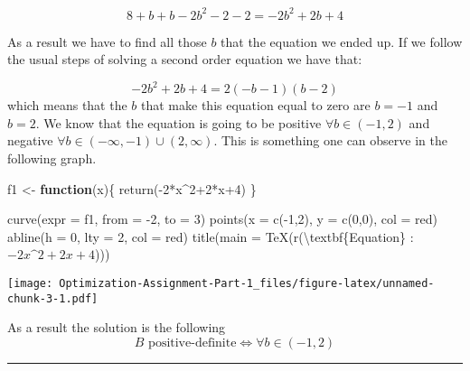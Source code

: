 \documentclass[
]{article}
\newenvironment{Shaded}{\begin{snugshade}}{\end{snugshade}}
\newcommand{\AttributeTok}[1]{\textcolor[rgb]{0.77,0.63,0.00}{#1}}
\newcommand{\ControlFlowTok}[1]{\textcolor[rgb]{0.13,0.29,0.53}{\textbf{#1}}}
\newcommand{\DecValTok}[1]{\textcolor[rgb]{0.00,0.00,0.81}{#1}}
\newcommand{\FunctionTok}[1]{\textcolor[rgb]{0.00,0.00,0.00}{#1}}
\newcommand{\NormalTok}[1]{#1}
\newcommand{\OtherTok}[1]{\textcolor[rgb]{0.56,0.35,0.01}{#1}}
\newcommand{\SpecialCharTok}[1]{\textcolor[rgb]{0.00,0.00,0.00}{#1}}
\newcommand{\StringTok}[1]{\textcolor[rgb]{0.31,0.60,0.02}{#1}}
\begin{document}
\[
8+b+b-2b^2-2-2=-2b^2+2b+4
\]

As a result we have to find all those \(b\) that the equation we ended
up. If we follow the usual steps of solving a second order equation we
have that:

\[
−2b^2+2b+4=2(−b−1)(b−2)
\] which means that the \(b\) that make this equation equal to zero are
\(b=-1\) and \(b=2\). We know that the equation is going to be positive
\(\forall b \in (-1,2)\) and negative
\(\forall b \in (-\infty,-1)\cup(2,\infty)\). This is something one can
observe in the following graph.

\begin{Shaded}
\begin{Highlighting}[]
\NormalTok{f1 }\OtherTok{\textless{}{-}} \ControlFlowTok{function}\NormalTok{(x)\{}
        \FunctionTok{return}\NormalTok{(}\SpecialCharTok{{-}}\DecValTok{2}\SpecialCharTok{*}\NormalTok{x}\SpecialCharTok{\^{}}\DecValTok{2}\SpecialCharTok{+}\DecValTok{2}\SpecialCharTok{*}\NormalTok{x}\SpecialCharTok{+}\DecValTok{4}\NormalTok{)}
\NormalTok{\}}

\FunctionTok{curve}\NormalTok{(}\AttributeTok{expr =}\NormalTok{ f1, }\AttributeTok{from =} \SpecialCharTok{{-}}\DecValTok{2}\NormalTok{, }\AttributeTok{to =} \DecValTok{3}\NormalTok{)}
\FunctionTok{points}\NormalTok{(}\AttributeTok{x =} \FunctionTok{c}\NormalTok{(}\SpecialCharTok{{-}}\DecValTok{1}\NormalTok{,}\DecValTok{2}\NormalTok{), }\AttributeTok{y =} \FunctionTok{c}\NormalTok{(}\DecValTok{0}\NormalTok{,}\DecValTok{0}\NormalTok{), }\AttributeTok{col =} \StringTok{\textquotesingle{}red\textquotesingle{}}\NormalTok{)}
\FunctionTok{abline}\NormalTok{(}\AttributeTok{h =} \DecValTok{0}\NormalTok{, }\AttributeTok{lty =} \DecValTok{2}\NormalTok{, }\AttributeTok{col =} \StringTok{\textquotesingle{}red\textquotesingle{}}\NormalTok{)}
\FunctionTok{title}\NormalTok{(}\AttributeTok{main =} \FunctionTok{TeX}\NormalTok{(r}\StringTok{\textquotesingle{}(}\SpecialCharTok{\textbackslash{}t}\StringTok{extbf\{Equation\} : ${-}2x\^{}2+2x+4$)\textquotesingle{}}\NormalTok{))}
\end{Highlighting}
\end{Shaded}

\texttt{[image: Optimization-Assignment-Part-1\_files/figure-latex/unnamed-chunk-3-1.pdf]}

As a result the solution is the following \[
B\text{ positive-definite} \Leftrightarrow \forall b \in (-1,2)
\]

\begin{center}\rule{0.5\linewidth}{0.5pt}\end{center}
\end{document}
